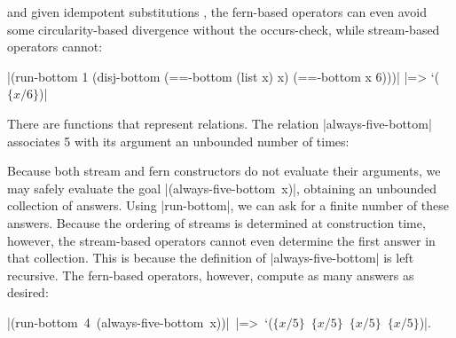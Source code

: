 \noindent and given idempotent substitutions \cite{lloyd:lp}, the
fern-based operators can even avoid some circularity-based divergence
without the occurs-check, while stream-based operators cannot:

\wspace

\scheme|(run-bottom 1 (disj-bottom (==-bottom (list x) x) (==-bottom x 6)))| \schemeresult|=> `($\{x/6\}$)|

\wspace

There are functions that represent relations. The relation
\scheme|always-five-bottom| associates 5 with its argument an unbounded number of times:

\schemedisplayspace
{}

\noindent Because both stream and fern constructors
do not evaluate their arguments,
we may safely evaluate the goal \mbox{\scheme|(always-five-bottom x)|}, %
obtaining an unbounded collection of answers.  Using
\scheme|run-bottom|, we can ask for a finite number of these answers. Because
the ordering of streams is determined at construction time, however, the
stream-based operators cannot even determine the first answer in that
collection. This is because the definition of \scheme|always-five-bottom| is left recursive.  The fern-based operators, however, compute as many answers 
as desired:

\medskip

\mbox{\scheme|(run-bottom 4 (always-five-bottom x))| \schemeresult|=> `($\{x/5\}$ $\{x/5\}$ $\{x/5\}$ $\{x/5\}$)|}.

\medskip









